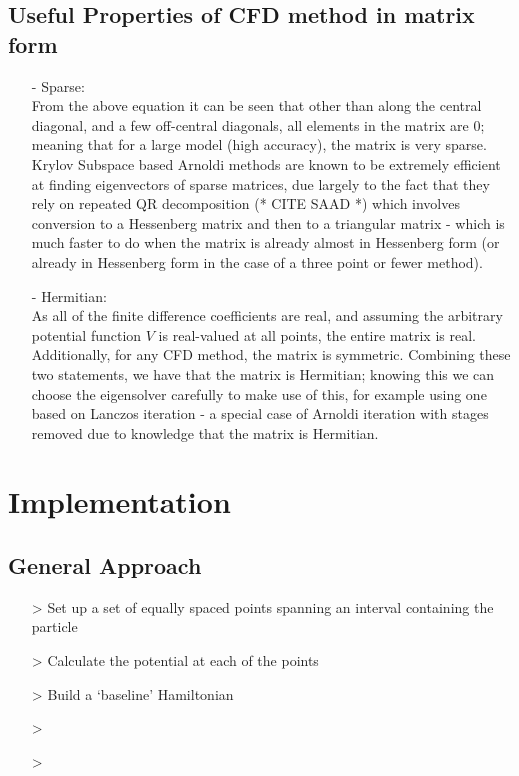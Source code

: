 \subsection{Useful Properties of CFD method in matrix form}
\begin{itemize}
\item[-]Sparse: \\ From the above equation it can be seen that other than along the central diagonal, and a few off-central diagonals, all elements in the matrix are $0$; meaning that for a large model (high accuracy), the matrix is very sparse. Krylov Subspace based Arnoldi methods are known to be extremely efficient at finding eigenvectors of sparse matrices, due largely to the fact that they rely on repeated QR decomposition (* CITE SAAD *) which involves conversion to a Hessenberg matrix and then to a triangular matrix - which is much faster to do when the matrix is already almost in Hessenberg form (or already in Hessenberg form in the case of a three point or fewer method).
\item[-]Hermitian: \\ As all of the finite difference coefficients are real, and assuming the arbitrary potential function $V$ is real-valued at all points, the entire matrix is real. Additionally, for any CFD method, the matrix is symmetric. Combining these two statements, we have that the matrix is Hermitian; knowing this we can choose the eigensolver carefully to make use of this, for example using one based on Lanczos iteration - a special case of Arnoldi iteration with stages removed due to knowledge that the matrix is Hermitian.
\end{itemize}

\section{Implementation}
\subsection{General Approach}
\begin{itemize}
    \item[>]{Set up a set of equally spaced points spanning an interval containing the particle}
    \item[>]{Calculate the potential at each of the points}
    \item[>]{Build a `baseline' Hamiltonian }
    \item[>]
    \item[>]
\end{itemize}
